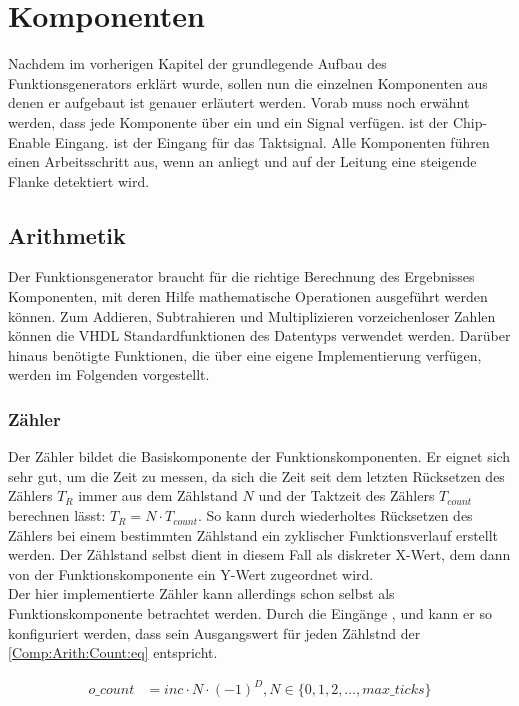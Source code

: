 \chapter{Komponenten}
Nachdem im vorherigen Kapitel der grundlegende Aufbau des Funktionsgenerators erklärt wurde, sollen nun die einzelnen Komponenten aus denen er aufgebaut ist genauer erläutert werden.
Vorab muss noch erwähnt werden, dass jede Komponente über ein  und ein  Signal verfügen.
 ist der Chip-Enable Eingang.  ist der Eingang für das Taktsignal.
Alle Komponenten führen einen Arbeitsschritt aus, wenn an   anliegt und auf der  Leitung eine steigende Flanke detektiert wird.

\section{Arithmetik}
Der Funktionsgenerator braucht für die richtige Berechnung des Ergebnisses Komponenten, mit deren Hilfe mathematische Operationen ausgeführt werden können.
Zum Addieren, Subtrahieren und Multiplizieren vorzeichenloser Zahlen können die VHDL Standardfunktionen des Datentyps  verwendet werden.
Darüber hinaus benötigte Funktionen, die über eine eigene Implementierung verfügen, werden im Folgenden vorgestellt.

\subsection{Zähler} \label{Comp:Arith:Count}
Der Zähler bildet die Basiskomponente der Funktionskomponenten. Er eignet sich sehr gut, um die Zeit zu messen, da sich die Zeit seit dem letzten Rücksetzen des Zählers $T_{R}$ immer aus dem Zählstand $N$ und der Taktzeit des Zählers $T_{count}$ berechnen lässt: $T_{R} = N \cdot T_{count}$. So kann durch wiederholtes Rücksetzen des Zählers bei einem bestimmten Zählstand ein zyklischer Funktionsverlauf erstellt werden.
Der Zählstand selbst dient in diesem Fall als diskreter X-Wert, dem dann von der Funktionskomponente ein Y-Wert zugeordnet wird.\\
Der hier implementierte Zähler kann allerdings schon selbst als Funktionskomponente betrachtet werden.
Durch die Eingänge ,  und  kann er so konfiguriert werden, dass sein Ausgangswert  für jeden Zählstnd  der \cref{Comp:Arith:Count:eq} entspricht.

\begin{align}
o\_count &= inc \cdot N \cdot (-1) ^ D, N \in \{0, 1, 2, \dots, max\_ticks\} \label{Comp:Arith:Count:eq}
\end{align}

